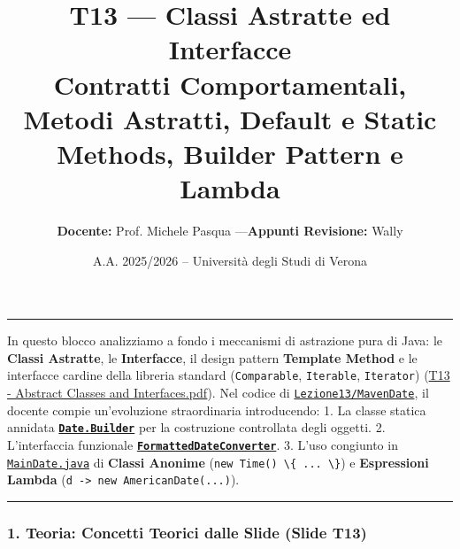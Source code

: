 \documentclass[11pt,a4paper]{article}
\title{\Huge\bfseries\sffamily\color{brandblue} T13 --- Classi Astratte ed Interfacce \\[0.3em] \large\sffamily Contratti Comportamentali, Metodi Astratti, Default e Static Methods, Builder Pattern e Lambda}
\author{\textbf{Docente:} Prof. Michele Pasqua \quad---\quad \textbf{Appunti Revisione:} Wally}
\date{A.A. 2025/2026 -- Universit\`a degli Studi di Verona}
\newcommand{\passthrough}[1]{#1}
\begin{document}
\maketitle
\thispagestyle{fancy}
\vspace{-1.2em}
\noindent\textcolor{brandblue}{\rule{\textwidth}{0.8pt}}
\vspace{1.2em}

In questo blocco analizziamo a fondo i meccanismi di astrazione pura di
Java: le \textbf{Classi Astratte}, le \textbf{Interfacce}, il design
pattern \textbf{Template Method} e le interfacce cardine della libreria
standard (\passthrough{\lstinline!Comparable!},
\passthrough{\lstinline!Iterable!}, \passthrough{\lstinline!Iterator!})
(\href{file:///home/wally/Documenti/GitHub/Programmazione-II/25-26/Teoria-e-Esercitazioni/Slides-20260902/T13\%20-\%20Abstract\%20Classes\%20and\%20Interfaces.pdf}{T13
- Abstract Classes and Interfaces.pdf}). Nel codice di
\href{file:///home/wally/Documenti/GitHub/Programmazione-II/25-26/Teoria-e-Esercitazioni/Codice-20260902/Lezione13/MavenDate}{\passthrough{\lstinline!Lezione13/MavenDate!}},
il docente compie un'evoluzione straordinaria introducendo: 1. La classe
statica annidata
\textbf{\href{file:///home/wally/Documenti/GitHub/Programmazione-II/25-26/Teoria-e-Esercitazioni/Codice-20260902/Lezione13/MavenDate/src/main/java/it/oop/core/Date.java}{\passthrough{\lstinline!Date.Builder!}}}
per la costruzione controllata degli oggetti. 2. L'interfaccia
funzionale
\textbf{\href{file:///home/wally/Documenti/GitHub/Programmazione-II/25-26/Teoria-e-Esercitazioni/Codice-20260902/Lezione13/MavenDate/src/main/java/it/oop/core/FormattedDateConverter.java}{\passthrough{\lstinline!FormattedDateConverter!}}}.
3. L'uso congiunto in
\href{file:///home/wally/Documenti/GitHub/Programmazione-II/25-26/Teoria-e-Esercitazioni/Codice-20260902/Lezione13/MavenDate/src/main/java/it/oop/ui/MainDate.java}{\passthrough{\lstinline!MainDate.java!}}
di \textbf{Classi Anonime}
(\passthrough{\lstinline!new Time() \{ ... \}!}) e \textbf{Espressioni
Lambda} (\passthrough{\lstinline!d -> new AmericanDate(...)!}).

\begin{center}\rule{0.5\linewidth}{0.5pt}\end{center}

\subsubsection{1. Teoria: Concetti Teorici dalle Slide (Slide
T13)}\label{teoria-concetti-teorici-dalle-slide-slide-t13}
\end{document}
